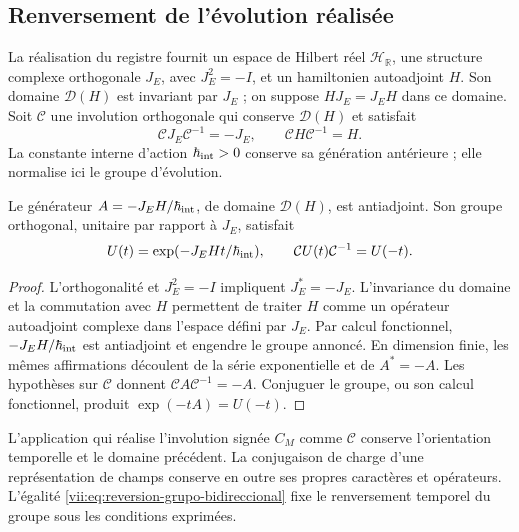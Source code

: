 \subsection{Renversement de l'évolution réalisée}
\label{vii:subsec:reversion-evolucion}

La réalisation du registre fournit un espace de Hilbert réel \(\mathcal H_{\mathbb R}\), une structure complexe orthogonale \(J_E\), avec \(J_E^2=-I\), et un hamiltonien autoadjoint \(H\). Son domaine \(\mathcal D(H)\) est invariant par \(J_E\) ; on suppose \(HJ_E=J_EH\) dans ce domaine. Soit \(\mathcal C\) une involution orthogonale qui conserve \(\mathcal D(H)\) et satisfait
\begin{equation}
 \mathcal C J_E\mathcal C^{-1}=-J_E,\qquad
 \mathcal C H\mathcal C^{-1}=H.
 \label{vii:eq:dominio-reversion-evolucion}
\end{equation}
La constante interne d'action \(\hbar_{\rm int}>0\) conserve sa
génération antérieure ; elle normalise ici le groupe d'évolution.

\begin{theorem}
\label{vii:thm:reversion-evolucion}
Le générateur \(A=-J_EH/\hbar_{\rm int}\), de domaine \(\mathcal D(H)\),
est antiadjoint. Son groupe orthogonal, unitaire par rapport à \(J_E\), satisfait
\begin{equation}
 U(t)=\exp(-J_EHt/\hbar_{\rm int}),\qquad
 \mathcal C U(t)\mathcal C^{-1}=U(-t).
 \label{vii:eq:reversion-grupo-bidireccional}
\end{equation}
\end{theorem}
\begin{proof}
L'orthogonalité et \(J_E^2=-I\) impliquent \(J_E^*=-J_E\).
L'invariance du domaine et la commutation avec \(H\) permettent de traiter
\(H\) comme un opérateur autoadjoint complexe dans l'espace défini par
\(J_E\). Par calcul fonctionnel, \(-J_EH/\hbar_{\rm int}\) est
antiadjoint et engendre le groupe annoncé. En dimension finie, les mêmes
affirmations découlent de la série exponentielle et de \(A^*=-A\).
Les hypothèses sur \(\mathcal C\) donnent
\(\mathcal C A\mathcal C^{-1}=-A\). Conjuguer le groupe, ou son calcul
fonctionnel, produit \(\exp(-tA)=U(-t)\).
\end{proof}

L'application qui réalise l'involution signée \(C_M\) comme \(\mathcal C\)
conserve l'orientation temporelle et le domaine précédent. La conjugaison de
charge d'une représentation de champs conserve en outre ses propres
caractères et opérateurs. L'égalité
\eqref{vii:eq:reversion-grupo-bidireccional} fixe le renversement temporel
du groupe sous les conditions exprimées.

